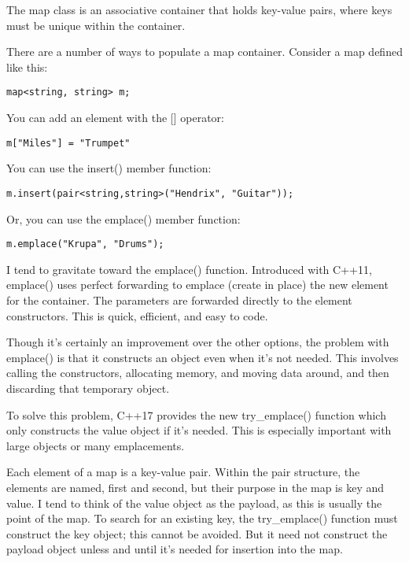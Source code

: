 
The map class is an associative container that holds key-value pairs, where keys must be unique within the container.

There are a number of ways to populate a map container. Consider a map defined like this:

\begin{lstlisting}[style=styleCXX]
map<string, string> m;
\end{lstlisting}

You can add an element with the [] operator:

\begin{lstlisting}[style=styleCXX]
m["Miles"] = "Trumpet"
\end{lstlisting}

You can use the insert() member function:

\begin{lstlisting}[style=styleCXX]
m.insert(pair<string,string>("Hendrix", "Guitar"));
\end{lstlisting}

Or, you can use the emplace() member function:

\begin{lstlisting}[style=styleCXX]
m.emplace("Krupa", "Drums");
\end{lstlisting}

I tend to gravitate toward the emplace() function. Introduced with C++11, emplace() uses perfect forwarding to emplace (create in place) the new element for the container. The parameters are forwarded directly to the element constructors. This is quick, efficient, and easy to code.
 
Though it's certainly an improvement over the other options, the problem with emplace() is that it constructs an object even when it's not needed. This involves calling the constructors, allocating memory, and moving data around, and then discarding that temporary object.

To solve this problem, C++17 provides the new try\_emplace() function which only constructs the value object if it's needed. This is especially important with large objects or many emplacements.

\begin{tcolorbox}[colback=webgreen!5!white,colframe=webgreen!75!black,title=Note]
Each element of a map is a key-value pair. Within the pair structure, the elements are named, first and second, but their purpose in the map is key and value. I tend to think of the value object as the payload, as this is usually the point of the map. To search for an existing key, the try\_emplace() function must construct the key object; this cannot be avoided. But it need not construct the payload object unless and until it's needed for insertion into the map.
\end{tcolorbox}

